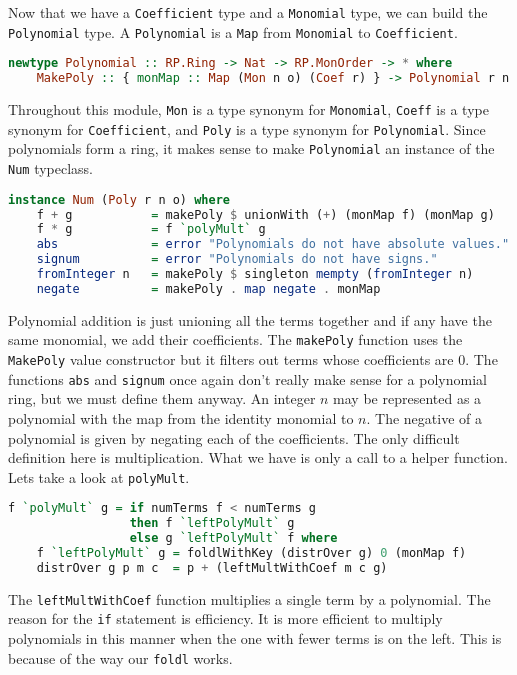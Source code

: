 \documentclass[MS, xcolor=dvipsnames]{wfuthesis}
\theoremstyle{definition}
\begin{document}
Now that we have a \lstinline{Coefficient} type and a \lstinline{Monomial} type, we can build the \lstinline{Polynomial} type. A \lstinline{Polynomial} is a \lstinline{Map} from \lstinline{Monomial} to \lstinline{Coefficient}.
\begin{lstlisting}[language=Haskell]
newtype Polynomial :: RP.Ring -> Nat -> RP.MonOrder -> * where
    MakePoly :: { monMap :: Map (Mon n o) (Coef r) } -> Polynomial r n o
\end{lstlisting}
Throughout this module, \lstinline{Mon} is a type synonym for \lstinline{Monomial}, \lstinline{Coeff} is a type synonym for \lstinline{Coefficient}, and \lstinline{Poly} is a type synonym for \lstinline{Polynomial}. Since polynomials form a ring, it makes sense to make \lstinline{Polynomial} an instance of the \lstinline{Num} typeclass.
\begin{lstlisting}[language=Haskell]
instance Num (Poly r n o) where
    f + g           = makePoly $ unionWith (+) (monMap f) (monMap g)
    f * g           = f `polyMult` g
    abs             = error "Polynomials do not have absolute values."
    signum          = error "Polynomials do not have signs."
    fromInteger n   = makePoly $ singleton mempty (fromInteger n)
    negate          = makePoly . map negate . monMap
\end{lstlisting}
Polynomial addition is just unioning all the terms together and if any have the same monomial, we add their coefficients. The \lstinline{makePoly} function uses the \lstinline{MakePoly} value constructor but it filters out terms whose coefficients are 0. The functions \lstinline{abs} and \lstinline{signum} once again don't really make sense for a polynomial ring, but we must define them anyway. An integer $n$ may be represented as a polynomial with the map from the identity monomial to $n$. The negative of a polynomial is given by negating each of the coefficients. The only difficult definition here is multiplication. What we have is only a call to a helper function. Lets take a look at \lstinline{polyMult}.
\begin{lstlisting}[language=Haskell]
f `polyMult` g = if numTerms f < numTerms g
                 then f `leftPolyMult` g
                 else g `leftPolyMult` f where
    f `leftPolyMult` g = foldlWithKey (distrOver g) 0 (monMap f)
    distrOver g p m c  = p + (leftMultWithCoef m c g)
\end{lstlisting}
The \lstinline{leftMultWithCoef} function multiplies a single term by a polynomial. The reason for the \lstinline{if} statement is efficiency. It is more efficient to multiply polynomials in this manner when the one with fewer terms is on the left. This is because of the way our \lstinline{foldl} works. \par
\end{document}
